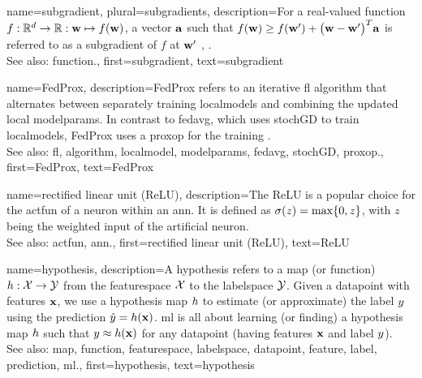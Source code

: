 {name={subgradient}, plural={subgradients},
	description={For a real-valued \gls{function} $f: \mathbb{R}^{d} \rightarrow \mathbb{R}: {\bf w} \mapsto f({\bf w})$, 
		a vector ${\bf a}$ such that $f({\bf w}) \geq  f({\bf w}') +\big({\bf w}-{\bf w}' \big)^{T} {\bf a}$ is 
		referred to as a subgradient of $f$ at ${\bf w}'$ \cite{BertCvxAnalOpt}, \cite{BertsekasNonLinProgr}.
		\\
		See also: \gls{function}.},
	first={subgradient},
	text={subgradient} 
}

{name={FedProx},
	description={FedProx refers to an iterative \gls{fl} \gls{algorithm} that alternates between separately 
		training \glspl{localmodel} and combining the updated local \gls{modelparams}. In contrast to \gls{fedavg}, which uses 
		\gls{stochGD} to train \glspl{localmodel}, FedProx uses a \gls{proxop} for the training \cite{FedProx2020}.
					\\ 
		See also: \gls{fl}, \gls{algorithm}, \gls{localmodel}, \gls{modelparams}, \gls{fedavg}, \gls{stochGD}, \gls{proxop}.}, 
	first={FedProx}, 
	text={FedProx} 
}

{name={rectified linear unit (ReLU)},
	description={The ReLU is 
		a popular choice for the \gls{actfun} of a neuron within an \gls{ann}. It is defined 
		as $\sigma(z) = \max\{0,z\}$, with $z$ being the weighted input of the artificial 
		neuron.
					\\ 
		See also: \gls{actfun}, \gls{ann}.}, 
	first={rectified linear unit (ReLU)}, 
	text={ReLU} 
}

{name={hypothesis},
	description={A hypothesis refers to a \gls{map} (or \gls{function}) $h: \mathcal{X} \rightarrow \mathcal{Y}$ from the 
		\gls{featurespace} $\mathcal{X}$ to the \gls{labelspace} $\mathcal{Y}$. 
		Given a \gls{datapoint} with \glspl{feature} ${\bf x}$, we use a hypothesis \gls{map} $h$
		to estimate (or approximate) the \gls{label} $y$ using the \gls{prediction}  
		$\hat{y} = h({\bf x})$. \Gls{ml} is all about learning (or finding) a 
		hypothesis \gls{map} $h$ such that $y \approx h({\bf x})$ 
		for any \gls{datapoint} (having \glspl{feature} ${\bf x}$ and \gls{label} $y$).
					\\ 
		See also: \gls{map}, \gls{function}, \gls{featurespace}, \gls{labelspace}, \gls{datapoint}, \gls{feature}, \gls{label}, \gls{prediction}, \gls{ml}.},
	first={hypothesis},
	text={hypothesis}  
}



